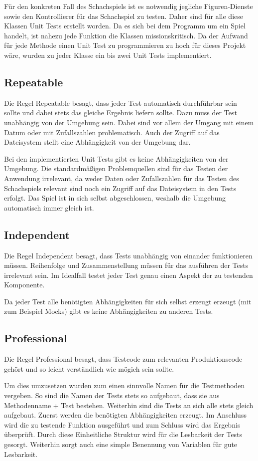 Für den konkreten Fall des Schachspiels ist es notwendig jegliche Figuren-Dienste sowie den Kontrollierer für das Schachspiel zu testen. Daher sind für alle diese Klassen Unit Tests erstellt worden. Da es sich bei dem Programm um ein Spiel handelt, ist nahezu jede Funktion die Klassen missionskritisch. Da der Aufwand für jede Methode einen Unit Test zu programmieren zu hoch für dieses Projekt wäre, wurden zu jeder Klasse ein bis zwei Unit Tests implementiert.

\subsection{Repeatable}
Die Regel \glqq{}Repeatable\grqq{} besagt, dass jeder Test automatisch durchführbar sein sollte und dabei stets das gleiche Ergebnis liefern sollte. Dazu muss der Test unabhängig von der Umgebung sein. Dabei sind vor allem der Umgang mit einem Datum oder mit Zufallszahlen problematisch. Auch der Zugriff auf das Dateisystem stellt eine Abhängigkeit von der Umgebung dar.

Bei den implementierten Unit Tests gibt es keine Abhängigkeiten von der Umgebung. Die standardmäßigen Problemquellen sind für das Testen der Anwendung irrelevant, da weder Daten oder Zufallszahlen für das Testen des Schachspiels relevant sind noch ein Zugriff auf das Dateisystem in den Tests erfolgt. Das Spiel ist in sich selbst abgeschlossen, weshalb die Umgebung automatisch immer gleich ist.

\subsection{Independent}
Die Regel \glqq{}Independent\grqq{} besagt, dass Tests unabhängig von einander funktionieren müssen. Reihenfolge und Zusammenstellung müssen für das ausführen der Tests irrelevant sein. Im Idealfall testet jeder Test genau einen Aspekt der zu testenden Komponente.

Da jeder Test alle benötigten Abhängigkeiten für sich selbst erzeugt erzeugt (mit zum Beispiel Mocks) gibt es keine Abhängigkeiten zu anderen Tests.

\subsection{Professional}
Die Regel \glqq{}Professional\grqq{} besagt, dass Testcode zum relevanten Produktionscode gehört und so leicht verständlich wie mögich sein sollte.

Um dies umzusetzen wurden zum einen sinnvolle Namen für die Testmethoden vergeben. So sind die Namen der Tests stets so aufgebaut, dass sie aus Methodenname + \glqq{}Test\grqq{} bestehen. Weiterhin sind die Tests an sich alle stets gleich aufgebaut. Zuerst werden die benötigten Abhängigkeiten erzeugt. Im Anschluss wird die zu testende Funktion ausgeführt und zum Schluss wird das Ergebnis überprüft. Durch diese Einheitliche Struktur wird für die Lesbarkeit der Tests gesorgt.  Weiterhin sorgt auch eine simple Benennung von Variablen für gute Lesbarkeit.


